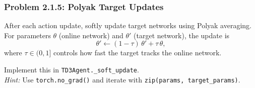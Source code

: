 \documentclass[12pt]{article}
\begin{document}
\subsubsection*{Problem 2.1.5: Polyak Target Updates}
After each action update, softly update target networks using Polyak averaging. For parameters \(\theta\) (online network) and \(\theta'\) (target network), the update is
\begin{equation}
\theta' \leftarrow (1-\tau)\,\theta' + \tau\,\theta,
\end{equation}
where \(\tau \in (0,1]\) controls how fast the target tracks the online network.  

Implement this in \texttt{TD3Agent.\_soft\_update}.  \\
\textit{Hint:} Use \texttt{torch.no\_grad()} and iterate with \texttt{zip(params, target\_params)}.



\end{document}
